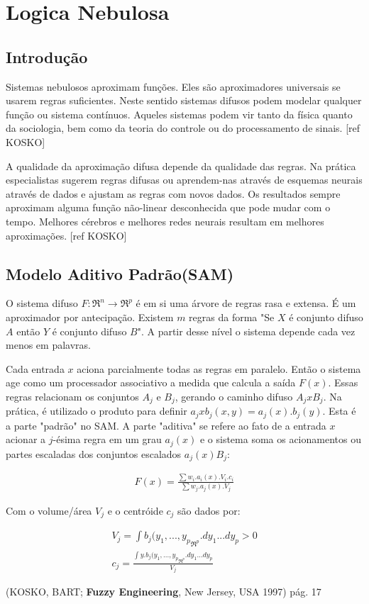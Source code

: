 \section{Logica Nebulosa} 

\subsection{Introdução}

Sistemas nebulosos aproximam funções. Eles são aproximadores universais se usarem regras suficientes. 
Neste sentido sistemas difusos podem modelar qualquer função ou sistema contínuos. Aqueles sistemas podem 
vir tanto da física quanto da sociologia, bem como da teoria do controle ou do processamento de sinais.
[ref KOSKO]

A qualidade da aproximação difusa depende da qualidade das regras. Na prática especialistas sugerem regras
difusas ou aprendem-nas através de esquemas neurais através de dados e ajustam as regras com novos dados.
Os resultados sempre aproximam alguma função não-linear desconhecida que pode mudar com o tempo. Melhores 
cérebros e melhores redes neurais resultam em melhores aproximações. [ref KOSKO]

\subsection{Modelo Aditivo Padrão(SAM)}

O sistema difuso $F:\Re^n \rightarrow \Re^p$ é em si uma árvore de regras rasa e extensa. É um aproximador
por antecipação. Existem $m$ regras da forma "Se $X$ é conjunto difuso $A$ então $Y$ é conjunto difuso $B$".
A partir desse nível o sistema depende cada vez menos em palavras. 

Cada entrada $x$ aciona parcialmente todas as regras em paralelo. Então o sistema age como um processador 
associativo a medida que calcula a saída
$F(x)$. 
Essas regras relacionam os conjuntos $A_j$ e $B_j$, gerando o caminho difuso $A_j x B_j$. Na prática,
é utilizado o produto para definir $ a_j x b_j (x,y) = a_j(x).b_j(y)$. Esta é a parte "padrão" no SAM.
A parte "aditiva" se refere ao fato de a entrada $x$ acionar a $j$-ésima regra em um grau $a_j(x)$ e o sistema 
soma os acionamentos ou partes escaladas dos conjuntos escalados $a_j(x)B_j$:

\begin{eqnarray}
F(x) = \frac{\sum w_i.a_i(x).V_i.c_i}{\sum w_j.a_j(x).V_j}
\end{eqnarray}

Com o volume/área $V_j$ e o centróide $c_j$ são dados por:

\begin{eqnarray}
V_j = \int{b_j(y_1,...,y_p}_{\Re^{p}}.dy_1...dy_p > 0\\
c_j = \frac{\int{y.b_j(y_1,...,y_p}_{\Re^{p}}.dy_1...dy_p}{V_j}
\end{eqnarray}



(KOSKO, BART; \textbf{Fuzzy Engineering}, New Jersey, USA 1997) pág. 17
